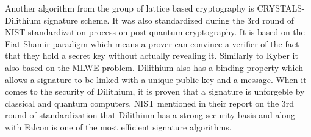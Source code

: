 Another algorithm from the group of lattice based cryptography is CRYSTALS-Dilithium signature scheme. It was also standardized during the 3rd round of NIST standardization process on post quantum cryptography. It is based on the Fiat-Shamir paradigm which means a prover can convince a verifier of the fact that they hold a secret key without actually revealing it. Similarly to Kyber it also based on the MLWE problem. Dilithium also has a binding property which allows a signature to be linked with a unique public key and a message. When it comes to the security of Dilithium, it is proven that a signature is unforgeble by classical and quantum computers. NIST mentioned in their report on the 3rd round of standardization that Dilithium has a strong security basis and along with Falcon is one of the most efficient signature algorithms. \cite{Alagic2022}
